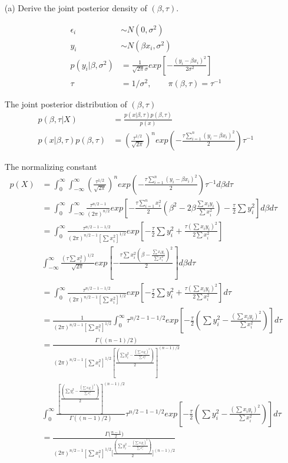 \begin{itemize}
	\item [(a)] Derive the joint posterior density of $(\beta, \tau)$.
	
	\begin{align*}
		\epsilon_i & \sim N(0, \sigma^2) \\
		y_i & \sim N(\beta x_i, \sigma^2) \\
		p(y_i|\beta, \sigma^2) &= \frac{1}{\sqrt{2\pi} \sigma} exp[-\frac{(y_i-\beta x_i)^2}{2\sigma^2}] \\
		\tau &= 1/\sigma^2, \qquad \pi(\beta, \tau) = \tau^{-1}
	\end{align*}	
	
	The joint posterior distribution of $(\beta, \tau)$ 
\begin{align*}
	p(\beta, \tau|X) &= \frac{p(x|\beta, \tau) p(\beta, \tau)}{p(x)} \\
	p(x|\beta, \tau) p(\beta, \tau) &= (\frac{\tau^{1/2}}{\sqrt{2\pi}})^n exp(-\frac{\tau \sum_{i=1}^n (y_i-\beta x_i)^2}{2}) \tau^{-1}
\end{align*}	

	The normalizing constant
		\begin{align*}
		p(X) &= \int_{0}^{\infty} \int_{-\infty}^{\infty} (\frac{\tau^{1/2}}{\sqrt{2\pi}})^n exp(-\frac{\tau \sum_{i=1}^n (y_i-\beta x_i)^2}{2}) \tau^{-1} d\beta d\tau \\
		&=  \int_{0}^{\infty} \int_{-\infty}^{\infty} \frac{\tau^{n/2-1}}{(2\pi)^{n/2}} exp[-\frac{\tau \sum_{i=1}^n x_i^2}{2} (\beta^2 -2 \beta \frac{\sum x_i y_i}{\sum x_i^2} ) - \frac{\tau}{2} \sum y_i^2] d\beta d\tau \\
		&= \int_{0}^{\infty} \frac{\tau^{n/2-1-1/2}}{(2\pi)^{n/2-1} [\sum x_i^2]^{1/2}} exp[-\frac{\tau}{2} \sum y_i^2 + \frac{\tau (\sum x_iy_i)^2}{2 \sum x_i^2}] \\
		& \int_{-\infty}^{\infty} \frac{(\tau \sum x_i^2)^{1/2}}{\sqrt{2\pi}} exp[-\frac{\tau \sum x_i^2 (\beta - \frac{\sum x_i y_i}{\sum x_i^2})^2}{2}] d\beta d\tau \\
		&= \int_{0}^{\infty} \frac{\tau^{n/2-1-1/2}}{(2\pi)^{n/2-1} [\sum x_i^2]^{1/2}} exp[-\frac{\tau}{2} \sum y_i^2 + \frac{\tau (\sum x_iy_i)^2}{2 \sum x_i^2}] d\tau\\
		&= \frac{1}{(2\pi)^{n/2-1} [\sum x_i^2]^{1/2}} \int_{0}^{\infty} \tau^{n/2-1-1/2} exp[-\frac{\tau}{2} (\sum y_i^2 - \frac{(\sum x_iy_i)^2}{\sum x_i^2})] d\tau \\
		&=  \frac{\Gamma((n-1)/2)}{(2\pi)^{n/2-1} [\sum x_i^2]^{1/2} [\frac{(\sum y_i^2 - \frac{(\sum x_iy_i)^2}{\sum x_i^2})}{2}]^{(n-1)/2}} \\
		& \int_{0}^{\infty} \frac{[\frac{(\sum y_i^2 - \frac{(\sum x_iy_i)^2}{\sum x_i^2})}{2}]^{(n-1)/2}}{\Gamma((n-1)/2)} \tau^{n/2-1-1/2} exp[-\frac{\tau}{2} (\sum y_i^2 - \frac{(\sum x_iy_i)^2}{\sum x_i^2})] d\tau \\
		&= \frac{\Gamma \Big( \frac{n-1}{2} \Big)}{(2\pi)^{n/2-1} [\sum x_i^2]^{1/2} \Big [\frac{(\sum y_i^2 - \frac{(\sum x_iy_i)^2}{\sum x_i^2})}{2} \Big ]^{(n-1)/2}}
	\end{align*}	


\end{itemize}
